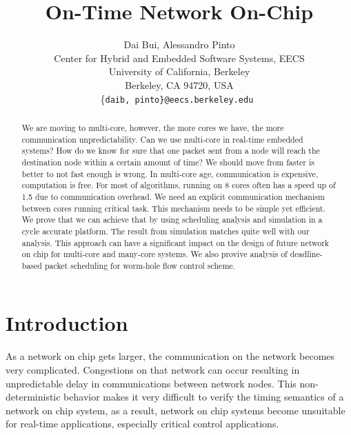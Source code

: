 \documentclass[conference, twocolumn]{IEEEtran}
\theoremstyle{definition}
\begin{document}
\title{On-Time Network On-Chip}

\author{Dai Bui, Alessandro Pinto \\
	Center for Hybrid and Embedded Software Systems, EECS \\
    University of California, Berkeley \\
    Berkeley, CA 94720, USA \\
    \{\tt daib, pinto\}@eecs.berkeley.edu
}

\maketitle

\begin{abstract}
We are moving to multi-core, however, the more cores we have, the more
communication unpredictability. Can we use multi-core in real-time embedded
systems? How do we know for sure that one packet sent from a node will reach
the destination node within a certain amount of time? We should move from
faster is better to not fast enough is wrong. In multi-core age, communication
is expensive, computation is free. For most of algorithms, running on 8 cores
often has a speed up of 1.5 due to communication overhead. We need an explicit
communication mechanism between cores running critical task. This mechanism
needs to be simple yet efficient. We prove that we can achieve that by using
scheduling analysis and simulation in a cycle accurate platform. The result from
simulation matches quite well with our analysis. This approach can have a
significant impact on the design of future network on chip for multi-core and
many-core systems. We also provive analysis of deadline-based packet scheduling
for worm-hole flow control scheme.

\end{abstract}

\section{Introduction}
As a network on chip gets larger, the communication on the network becomes 
very complicated. Congestions on that network can occur resulting in unpredictable 
delay in communications between network nodes. This non-deterministic behavior 
makes it very difficult to verify the timing semantics of a network on chip 
system, as a result, network on chip systems become unsuitable for real-time 
applications, especially critical control applications.
\end{document}
